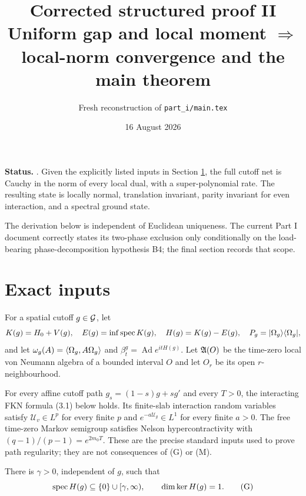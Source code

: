 \documentclass[11pt,a4paper]{article}
\title{Corrected structured proof II\\[3pt]
Uniform gap and local moment $\Longrightarrow$ local-norm convergence and the main theorem}
\author{Fresh reconstruction of \texttt{part\_i/main.tex}}
\date{16 August 2026}
\begin{document}
\maketitle

\begin{resultbox}
\textbf{Status.} \Conditional.  Given the explicitly listed inputs in Section
\ref{sec:inputs}, the full cutoff net is Cauchy in the norm of every local dual,
with a super-polynomial rate.  The resulting state is locally normal, translation
invariant, parity invariant for even interaction, and a spectral ground state.

The derivation below is independent of Euclidean uniqueness.  The current Part I
document correctly states its two-phase exclusion only conditionally on the
load-bearing phase-decomposition hypothesis B4; the final section records that scope.
\end{resultbox}

\tableofcontents

\section{Exact inputs}\label{sec:inputs}

For a spatial cutoff $g\in\mathcal G$, let
\[
 K(g)=H_0+V(g),\quad E(g)=\inf\operatorname{spec} K(g),\quad
 H(g)=K(g)-E(g),\quad P_g=|\Omega_g\rangle\langle\Omega_g|,
\]
and let $\omega_g(A)=\langle \Omega_g,A\Omega_g\rangle$ and
$\beta_t^g=\operatorname{Ad}e^{itH(g)}$.  Let $\mathfrak A(O)$ be the time-zero local
von Neumann algebra of a bounded interval $O$ and let $O_r$ be its open
$r$-neighbourhood.

\begin{assumption}\label{ass:F}
For every affine cutoff path $g_s=(1-s)g+sg'$ and every $T>0$, the interacting
FKN formula (3.1) below holds.  Its finite-slab interaction random variables satisfy
$\mathcal U_v\in L^p$ for every finite $p$ and
$e^{-a\mathcal U_g}\in L^1$ for every finite $a>0$.  The free time-zero Markov
semigroup satisfies Nelson hypercontractivity with
$(q-1)/(p-1)=e^{2m_0T}$.  These are the precise standard inputs used to prove path
regularity; they are not consequences of (G) or (M).
\end{assumption}

\begin{assumption}\label{ass:G}
There is $\gamma>0$, independent of $g$, such that
\[
 \operatorname{spec} H(g)\subseteq\{0\}\cup[\gamma,\infty),
 \qquad \dim\ker H(g)=1.                                           \tag{G}
\]
\end{assumption}
\end{document}

